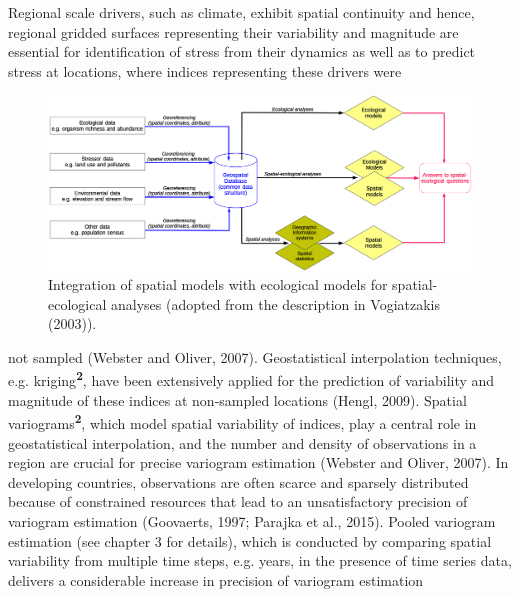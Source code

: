 Regional scale drivers, such as climate, exhibit spatial continuity and hence, regional gridded surfaces representing their variability and magnitude are essential for identification of stress from their dynamics as well as to predict stress at locations, where indices representing these drivers were

\begin{landscape}
\noindent\begin{figure}[t]
  \centering
  \includegraphics[width=\linewidth]{Figures/Fig_1_1.png}
  \caption{Integration of spatial models with ecological models for spatial-ecological analyses (adopted from the description in Vogiatzakis (2003)).}
  \label{Fig_1_1}
\end{figure}

\noindent not sampled (Webster and Oliver, 2007). Geostatistical interpolation techniques, e.g. kriging\textsuperscript{\textbf{2}}, have been extensively applied for the prediction of variability and magnitude of these indices at non-sampled locations (Hengl, 2009). Spatial variograms\textsuperscript{\textbf{2}}, which model spatial variability of indices, play a central role in geostatistical interpolation, and the number and density of observations in a region are crucial for precise variogram estimation (Webster and Oliver, 2007). In developing countries, observations are often scarce and sparsely distributed because of constrained resources that lead to an unsatisfactory precision of variogram estimation (Goovaerts, 1997; Parajka et al., 2015). Pooled variogram estimation (see chapter 3 for details), which is conducted by comparing spatial variability from multiple time steps, e.g. years, in the presence of time series data, delivers a considerable increase in precision of variogram estimation

\end{landscape}

